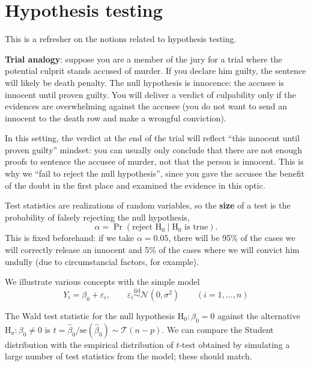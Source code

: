 \documentclass[]{book}
\theoremstyle{definition}
\theoremstyle{definition}
\theoremstyle{definition}
\theoremstyle{remark}
\begin{document}
\hypertarget{hypothesis-testing}{%
\chapter{Hypothesis testing}\label{hypothesis-testing}}

This is a refresher on the notions related to hypothesis testing.

\textbf{Trial analogy}: suppose you are a member of the jury for a trial where the potential culprit stands accused of murder. If you declare him guilty, the sentence will likely be death penalty. The null hypothesis is innocence: the accusee is innocent until proven guilty. You will deliver a verdict of culpability only if the evidences are overwhelming against the accusee (you do not want to send an innocent to the death row and make a wrongful conviction).

In this setting, the verdict at the end of the trial will reflect ``this innocent until proven guilty'' mindset: you can usually only conclude that there are not enough proofs to sentence the accusee of murder, not that the person is innocent. This is why we ``fail to reject the null hypothesis'', since you gave the accusee the benefit of the doubt in the first place and examined the evidence in this optic.

Test statistics are realizations of random variables, so the \textbf{size} of a test is the probability of falsely rejecting the null hypothesis,
\[\alpha = \Pr(\text{reject }\mathrm{H}_0 \mid \mathrm{H}_0 \text{ is true}).\]This is fixed beforehand: if we take \(\alpha = 0.05\), there will be 95\% of the cases we will correctly release an innocent and 5\% of the cases where we will convict him undully (due to circumstancial factors, for example).

We illustrate various concepts with the simple model \[Y_i = \beta_0 + \varepsilon_i, \qquad\varepsilon_i \stackrel{\mathrm{iid}}{\sim} \mathcal{N}(0, \sigma^2) \qquad (i=1, \ldots, n)\]

The Wald test statistic for the null hypothesis \(\mathrm{H}_0: \beta_0=0\) against the alternative \(\mathrm{H}_a: \beta_0 \neq 0\) is \(t = \hat{\beta}_0/\mathrm{se}(\hat{\beta}_0) \sim \mathcal{T}(n-p)\).
We can compare the Student distribution with the empirical distribution of \(t\)-test obtained by simulating a large number of test statistics from the model; these should match.
\end{document}
